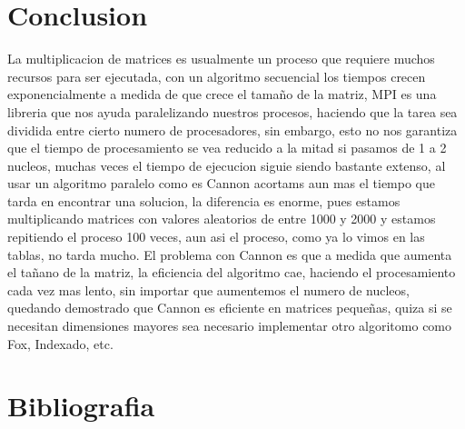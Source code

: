 \documentclass[12pt]{article}
\begin{document}
\begin{titlepage}

\section*{Conclusion}



La multiplicacion de matrices es usualmente un proceso que requiere muchos recursos para ser ejecutada, con un algoritmo secuencial los tiempos crecen exponencialmente a medida de que crece el tamaño de la matriz, MPI es una libreria que nos ayuda paralelizando nuestros procesos, haciendo que la tarea sea dividida entre cierto numero de procesadores, sin embargo, esto no nos garantiza que el tiempo de procesamiento se vea reducido a la mitad si pasamos de 1 a 2 nucleos, muchas veces el tiempo de ejecucion siguie siendo bastante extenso, al usar un algoritmo paralelo como es Cannon acortams aun mas el tiempo que tarda en encontrar una solucion, la diferencia es enorme, pues estamos multiplicando matrices con valores aleatorios de entre 1000 y 2000 y estamos repitiendo el proceso 100 veces, aun asi el proceso, como ya lo vimos en las tablas, no tarda mucho. El problema con Cannon es que a medida que aumenta el tañano de la matriz, la eficiencia del algoritmo cae, haciendo el procesamiento cada vez mas lento, sin importar que aumentemos el numero de nucleos, quedando demostrado que Cannon es eficiente en matrices pequeñas, quiza si se necesitan dimensiones mayores sea necesario implementar otro algoritomo como Fox, Indexado, etc.

%

\section*{Bibliografia}

\end{titlepage}
\end{document}

